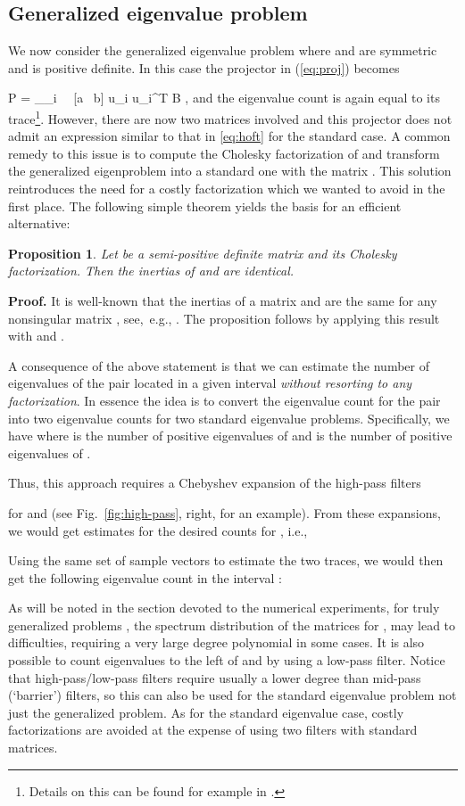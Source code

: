 \documentclass[12pt]{article}		\usepackage{tabls,multirow}
\newtheorem{proposition}{Proposition}[section]
\newenvironment{proof}{\begin{trivlist}
                       \item[]{\bf Proof.}
                       \hspace{0cm} }{\hfill 
                       \end{trivlist}}
\def\nref#1{(\ref{#1})}
\newcommand{\eq}[1]{}
\begin{document}
\subsection{Generalized eigenvalue problem}
We now consider the generalized eigenvalue problem  where
 and  are symmetric and  is positive definite. In this case
the projector  in \nref{eq:proj} becomes
\eq{eq:projG}
P = \sum_{\lambda_i \ \in \ [a  \ b]} u_i u_i^T B , 
\en 
and the eigenvalue count is again equal to its trace\footnote{Details on this can be found for example in \cite{Kramer-al-FEAST-2013}.}.
However, there are now two matrices involved and
 this projector does not admit an expression similar to that in
\eqref{eq:hoft} for  the standard case.
A common remedy to this issue is to compute the Cholesky factorization
 of  and transform the generalized eigenproblem into a
standard one with the matrix . This solution
reintroduces the need for a costly factorization which we wanted to
avoid in the first place. The following simple theorem yields the
basis for an efficient alternative:
\begin{proposition} 
  Let  be a semi-positive definite matrix and  its
  Cholesky factorization.  Then the inertias of  and  are identical.
\end{proposition} 
\begin{proof}
It is well-known that the inertias of a matrix  and 
 are the same for any nonsingular matrix , see,\
e.g., \cite{GVL-book}. The proposition follows by applying
 this result with  and .
\end{proof}

A consequence of the above statement is that we can estimate
the number of eigenvalues of the pair  located in a given
interval \emph{without resorting to any factorization}. 
In essence the idea is to convert the eigenvalue count for the pair 
 into two eigenvalue counts for two standard eigenvalue
problems. Specifically, we have  where
  is the number of positive 
eigenvalues of  and  is
the number of positive eigenvalues of .

Thus, this approach requires a  Chebyshev expansion of the high-pass filters

for  and  (see Fig.~\ref{fig:high-pass}, right,
 for an example). From these expansions, we would
get estimates for the desired counts  for , i.e., 
 
Using the same set of sample vectors to estimate the two traces, we would then
get the following  eigenvalue count in the interval :

As will be noted in the section devoted to the numerical experiments,
for truly generalized problems , the spectrum 
distribution of the matrices  for , may
lead to difficulties, requiring a very large degree polynomial in some
cases. It is also possible to count eigenvalues to the left of  and
 by using a low-pass filter. Notice that high-pass/low-pass filters
require usually a lower degree than mid-pass (`barrier') filters,  so
this can also be used for the standard eigenvalue problem not just the
generalized problem. As for the standard eigenvalue case, costly
factorizations are avoided at the expense of using two filters with
standard matrices.
\end{document}
